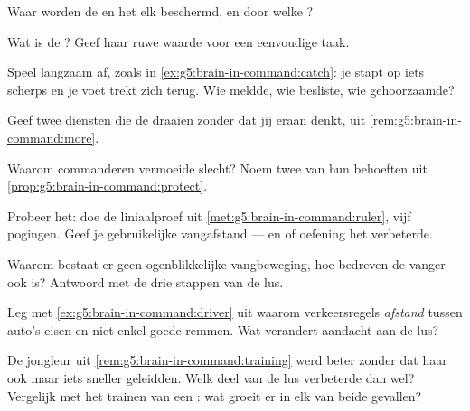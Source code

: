 \begin{exercise}[$\star$]\label{exo:g5:brain-in-command:3}
Waar worden de  en het  elk beschermd, en door welke
?
\end{exercise}

\begin{exercise}[$\star$]\label{exo:g5:brain-in-command:4}
Wat is de ? Geef haar ruwe waarde voor een eenvoudige taak.
\end{exercise}

\begin{exercise}[$\star$]\label{exo:g5:brain-in-command:5}
Speel langzaam af, zoals in \cref{ex:g5:brain-in-command:catch}: je stapt
op iets scherps en je voet trekt zich terug. Wie meldde, wie besliste,
wie gehoorzaamde?
\end{exercise}

\begin{exercise}[$\star$]\label{exo:g5:brain-in-command:6}
Geef twee diensten die de  draaien zonder dat jij eraan denkt,
uit \cref{rem:g5:brain-in-command:more}.
\end{exercise}

\begin{exercise}[$\star$]\label{exo:g5:brain-in-command:7}
Waarom commanderen vermoeide  slecht? Noem twee van hun
behoeften uit \cref{prop:g5:brain-in-command:protect}.
\end{exercise}

\begin{exercise}[$\star$]\label{exo:g5:brain-in-command:8}
Probeer het: doe de liniaalproef uit
\cref{met:g5:brain-in-command:ruler}, vijf pogingen. Geef je
gebruikelijke vangafstand --- en of oefening het verbeterde.
\end{exercise}

\begin{exercise}[$\star\star$]\label{exo:g5:brain-in-command:9}
Waarom bestaat er geen ogenblikkelijke vangbeweging, hoe bedreven de
vanger ook is? Antwoord met de drie stappen van de lus.
\end{exercise}

\begin{exercise}[$\star\star$]\label{exo:g5:brain-in-command:10}
Leg met \cref{ex:g5:brain-in-command:driver} uit waarom verkeersregels
\emph{afstand} tussen auto's eisen en niet enkel goede remmen. Wat
verandert aandacht aan de lus?
\end{exercise}

\begin{exercise}[$\star\star\star$]\label{exo:g5:brain-in-command:11}
De jongleur uit \cref{rem:g5:brain-in-command:training} werd beter
zonder dat haar  ook maar iets sneller geleidden. Welk deel van
de lus verbeterde dan wel? Vergelijk met het trainen van een : wat
groeit er in elk van beide gevallen?
\end{exercise}
